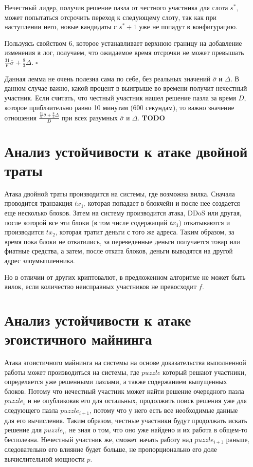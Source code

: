 Нечестный лидер, получив решение пазла от честного участника для слота $s^{*}$, может попытаться отсрочить переход к следующему слоту, так как при наступлении него, новые кандидаты с $s^{*}+1$ уже не попадут в конфигурацию.

Пользуясь свойством 6, которое устанавливает верхнюю границу на добавление изменения в лог, получаем, что ожидаемое время отсрочки не может превышать $\frac{31}{6}\bar{\sigma}+\frac{8}{3}\Delta$. $\square$
\vspace{10pt}

Данная лемма не очень полезна сама по себе, без реальных значений $\bar{\sigma}$ и $\Delta$. В данном случае важно, какой процент в выигрыше во времени получит нечестный участник. Если считать, что честный участник нашел решение пазла за время $D$, которое приблзительно равно 10 минутам (600 секундам), то важно значение отношения $\frac{\frac{31}{6}\bar{\sigma}+\frac{8}{3}\Delta}{D}$ при всех разумных $\bar{\sigma}$ и $\Delta$. \textbf{TODO}


\section{Анализ устойчивости к атаке двойной траты}
Атака двойной траты производится на системы, где возможна вилка. Сначала проводится транзакция $tx_1$, которая попадает в блокчейн и после нее создается еще несколько блоков. Затем на систему производится атака, DDoS или другая, после которой все эти блоки (в том числе содержащий $tx_1$) откатываются и производится $tx_2$, которая тратит деньги с того же адреса. Таким образом, за время пока блоки не откатились, за переведенные деньги получается товар или фиатные средства, а затем, после отката блоков, деньги выводятся на другой адрес злоумышленника.

Но в отличии от других криптовалют, в предложенном алгоритме не может быть вилок, если количество неисправных участников не превосходит $f$.

\section{Анализ устойчивости к атаке эгоистичного майнинга}
Атака эгоистичного майнинга на системы на основе доказательства выполненной работы может производиться на системы, где $puzzle$ который решают участники, определяется уже решенными пазлами, а также содержанием выпущенных блоков. Потому что нечестный участник может найти решение очередного пазла $puzzle_i$ и не опубликовав его для остальных, продолжить поиск решения уже для следующего пазла $puzzle_{i+1}$, потому что у него есть все необходимые данные для его вычисления. Таким образом, честные участники будут продолжать искать решение для $puzzle_i$, не зная о том, что оно уже найдено и их работа в общем-то бесполезна. Нечестный участник же, сможет начать работу над $puzzle_{i+1}$ раньше, следовательно его влияние будет больше, не пропорционально его доле вычислительной мощности $p$.

